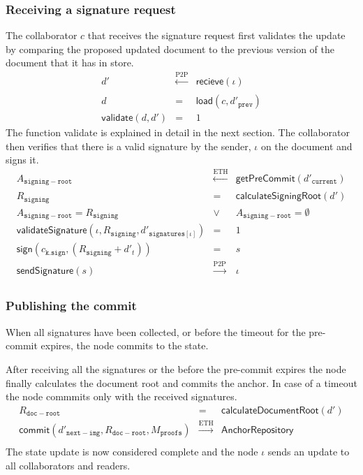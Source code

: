 \subsubsection{Receiving a signature request}
The collaborator $c$ that receives the signature request first validates the update by comparing the proposed updated document to the previous version of the document that it has in store. 
\begin{eqnarray}
   d' & \xleftarrow[]{\text{P2P}} & \mathsf{recieve}(\iota) \\
    d & = &\mathsf{load}(c, {d'}_{\mathtt{prev}}) \\
    \mathsf{validate}(d, d') & = & 1 
\end{eqnarray}
The function \textsf{validate} is explained in detail in the next section.
The collaborator then verifies that there is a valid signature by the sender, $\iota$ on the document and signs it.\\
\begin{eqnarray}
    A_{\mathtt{signing-root}} & \xleftarrow[]{\text{ETH}} & \mathsf{getPreCommit}(d'_{\mathtt{current}}) \\
    R_{\mathtt{signing}} & = & \mathsf{calculateSigningRoot}(d')\\
    A_{\mathtt{signing-root}} = R_{\mathtt{signing}} &\lor & A_{\mathtt{signing-root}} = \emptyset \\
    \mathsf{validateSignature}(\iota, R_{\mathtt{signing}}, {d'}_{\mathtt{signatures}[\iota]}) & = & 1\\
    \mathsf{sign}(c_{\mathtt{k.sign}}, (R_{\mathtt{signing}}+d'_{t})) & = & s \\
    \mathsf{sendSignature}(s) &\xrightarrow[]{\text{P2P}}& \iota
\end{eqnarray}

\subsubsection{Publishing the commit}

When all signatures have been collected, or before the timeout for the pre-commit expires, the node commits to the state. 

After receiving all the signatures or the before the pre-commit expires the node finally calculates the document root and commits the anchor.  In case of a timeout the node commmits only with the received signatures.
\begin{eqnarray}
R_{\mathtt{doc-root}} & = & \mathsf{calculateDocumentRoot}(d')\\
  \mathsf{commit}(d'_{\mathtt{next-img}}, R_{\mathtt{doc-root}},M_{\texttt{proofs}}) &\xrightarrow[]{\text{ETH}}& \mathsf{AnchorRepository}\\ 
  \end{eqnarray}
The state update is now considered complete and the node $\iota$ sends an update to all collaborators and readers.

